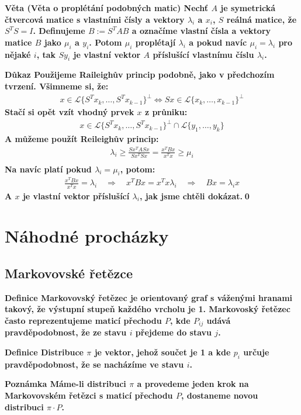 \documentclass[a4paper,12pt,titlepage]{article}
\newcommand{\dk}{\smallskip\noindent\bf Důkaz\rm{} }
\newcommand{\df}{\smallskip\noindent\bf Definice\rm{} }
\newcommand{\vt}{\smallskip\noindent\bf Věta\rm{} }
\newcommand{\pzn}{\smallskip\noindent\bf Poznámka\rm{} }
\renewcommand{\L}{\mathcal{L}}
\renewcommand{\L}{\mathcal{L}}
\begin{document}
\vt (Věta o proplétání podobných matic) Nechť $A$ je symetrická čtvercová matice 
s vlastními čísly a vektory $\lambda_i$ a $x_i$, $S$ reálná matice, že $S^TS=I$.  
Definujeme $B := S^TAB$ a označíme vlastní čísla a vektory matice $B$ jako 
$\mu_i$ a $y_i$. Potom $\mu_i$ proplétají $\lambda_i$ a pokud navíc $\mu_i = 
\lambda_i$ pro nějaké $i$, tak $Sy_i$ je vlastní vektor $A$ příslušící vlastnímu 
číslu $\lambda_i$.

\dk Použijeme Raileighův princip podobně, jako v předchozím tvrzení. Všimneme 
si, že:
\begin{align}
	x \in \L\{ S^Tx_k, \dots, S^Tx_{k-1}\}^\perp \Leftrightarrow
	Sx \in \L\{ x_k, \dots, x_{k-1}\}^\perp
\end{align}
Stačí si opět vzít vhodný prvek $x$ z průniku:
\begin{align}
	x \in \L\{ S^Tx_k, \dots, S^Tx_{k-1}\}^\perp \cap \L\{y_1, \dots, y_k\}
\end{align}
A můžeme použít Reileighův princip:
\begin{align}
	\lambda_i \geq \frac{Sx^TASx}{Sx^TSx} = \frac{x^TBx}{x^Tx} \geq \mu_i \\
\end{align}
Na navíc platí pokud $\lambda_i = \mu_i$, potom:
\begin{align}
	\frac{x^TBx}{x^Tx} = \lambda_i \quad\Rightarrow\quad x^TBx=x^Tx\lambda_i 
	\quad\Rightarrow\quad Bx = \lambda_i x
\end{align}
A $x$ je vlastní vektor příslušící $\lambda_i$, jak jsme chtěli dokázat.\qed



\section{Náhodné procházky}
\subsection{Markovovské řetězce}

\df Markovovský řetězec je orientovaný graf s váženými hranami takový, že
výstupní stupeň každého vrcholu je 1. Markovoský řetězec často reprezentujeme
maticí přechodu $P$, kde $P_{ij}$ udává pravděpodobnost, že ze stavu $i$
přejdeme do stavu $j$.

\df Distribuce $\pi$ je vektor, jehož součet je 1 a kde $p_i$ určuje
pravděpodobnost, že se nacházíme ve stavu $i$.

\pzn Máme-li distribuci $\pi$ a provedeme jeden krok na Markovovském řetězci s
maticí přechodu $P$, dostaneme novou distribuci $\pi\cdot P$.
\end{document}
